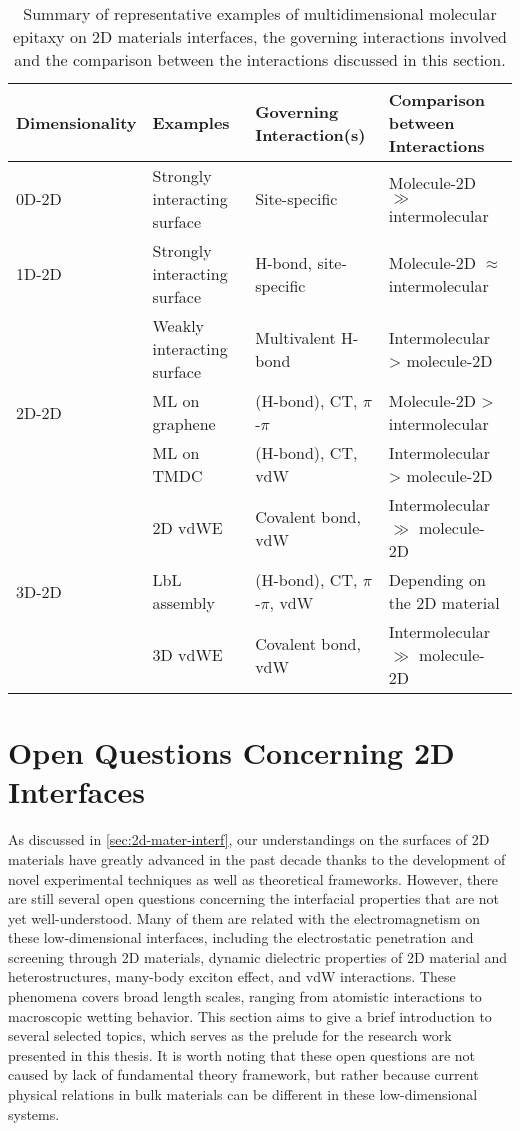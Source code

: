 \begin{table}[!htbp]
  \centering
  \caption{\label{tbl:intro-summary-multidimension}%
    Summary of representative examples of multidimensional molecular
    epitaxy on 2D materials interfaces, the governing interactions
    involved and the comparison between the interactions discussed in
    this section.               %
  }
  \small
\begin{tabularx}{1.0\textwidth}{XXXX}
\hline
Dimensionality & Examples & Governing Interaction(s) & Comparison between Interactions\\
\hline
0D-2D & Strongly interacting surface & Site-specific & Molecule-2D \(\gg\) intermolecular\\
\hline
1D-2D & Strongly interacting surface & H-bond,  site-specific & Molecule-2D \(\approx\) intermolecular\\
 & Weakly interacting surface & Multivalent H-bond & Intermolecular  \textgreater{} molecule-2D\\
\hline
2D-2D & ML on graphene & (H-bond), CT, \(\pi\)-\(\pi\) & Molecule-2D > intermolecular\\
 & ML on TMDC & (H-bond), CT, vdW & Intermolecular  \textgreater{} molecule-2D\\
 & 2D vdWE & Covalent bond,   vdW & Intermolecular  \(\gg\)  molecule-2D\\
\hline
3D-2D & LbL assembly & (H-bond), CT, \(\pi\)-\(\pi\), vdW & Depending on the 2D material\\
 & 3D vdWE & Covalent bond,   vdW & Intermolecular \(\gg\) molecule-2D\\
\hline
\end{tabularx}
\end{table}




\section{Open Questions  Concerning 2D Interfaces}
\label{sec:chall-probl-conc}

As discussed in \autoref{sec:2d-mater-interf}, our understandings on
the surfaces of 2D materials have greatly advanced in the past decade
thanks to the development of novel experimental techniques as well as
theoretical frameworks.
%
However, there are still several open questions concerning the
interfacial properties that are not yet well-understood. Many of them 
are related with the electromagnetism on these low-dimensional
interfaces, including the electrostatic penetration and screening
through 2D materials, dynamic dielectric properties of 2D material and
heterostructures, many-body exciton effect, and vdW interactions.
%
These phenomena covers broad length scales, ranging from atomistic
interactions to macroscopic wetting behavior.
%
This section aims to give a brief introduction to several selected
topics, which serves as the prelude for the research
work presented in this thesis.
%
It is worth noting that these open questions are not caused by lack of
fundamental theory framework, but rather because current physical
relations in bulk materials can be different in these
low-dimensional systems.

